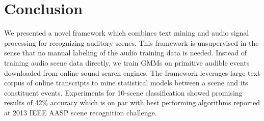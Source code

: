 \section{Conclusion}
\label{sec:conclude}

We presented a novel framework which combines text mining 
and audio signal processing for recognizing auditory scenes. This framework
is unsupervised in the sense that no manual labeling of the audio training
data is needed. Instead of training audio scene data directly, 
we train GMMs on primitive audible events downloaded from online 
sound search engines. The framework leverages
large text corpus of online transcripts to mine statistical
models between a scene and its constituent events. Experiments for
10-scene classification showed promising results of 42\% accuracy which is
on par with best performing algorithms
reported at 2013 IEEE AASP scene recognition challenge.
%
%

